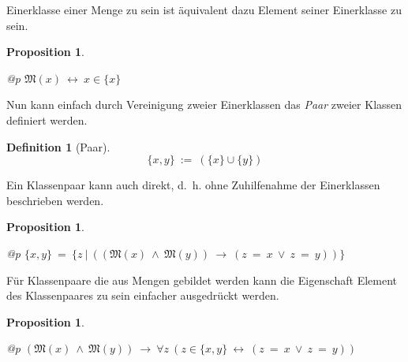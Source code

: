 \documentclass[a4paper,german,10pt,twoside]{book}
\newtheorem{prop}[thm]{Proposition}
\theoremstyle{definition}
\newtheorem{defn}[thm]{Definition}
\theoremstyle{remark}
\begin{document}
\par
Einerklasse einer Menge zu sein ist {\"a}quivalent dazu Element seiner
Einerklasse zu sein.

\begin{prop}
\label{theorem:setSingletonEqualHasItselfAsElement} \hypertarget{theorem:setSingletonEqualHasItselfAsElement}{}
\mbox{}
\begin{longtable}{{@{\extracolsep{\fill}}p{\linewidth}}}
\centering $\mathfrak{M}(x)\ \leftrightarrow \ x \in \{ x \}$
\end{longtable}

\end{prop}




\par
Nun kann einfach durch Vereinigung zweier Einerklassen das \emph{Paar}
zweier Klassen definiert werden.

\begin{defn}[Paar]
\label{definition:pair} \hypertarget{definition:pair}{}
$$\{ x, y \}\ := \ (\{ x \} \cup \{ y \})$$

\end{defn}




\par
Ein Klassenpaar kann auch direkt, d.~h. ohne Zuhilfenahme der Einerklassen
beschrieben werden.

\begin{prop}
\label{theorem:classPairIsEqual} \hypertarget{theorem:classPairIsEqual}{}
\mbox{}
\begin{longtable}{{@{\extracolsep{\fill}}p{\linewidth}}}
\centering $\{ x, y \} \ =  \ \{ z \ | \ ((\mathfrak{M}(x)\ \land \ \mathfrak{M}(y))\ \rightarrow \ (z \ =  \ x\ \lor \ z \ =  \ y)) \} $
\end{longtable}

\end{prop}




\par
F{\"u}r Klassenpaare die aus Mengen gebildet werden kann die Eigenschaft Element 
des Klassenpaares zu sein einfacher ausgedr{\"u}ckt werden.

\begin{prop}
\label{theorem:membershipOfClassPair} \hypertarget{theorem:membershipOfClassPair}{}
\mbox{}
\begin{longtable}{{@{\extracolsep{\fill}}p{\linewidth}}}
\centering $(\mathfrak{M}(x)\ \land \ \mathfrak{M}(y))\ \rightarrow \ \forall z\ (z \in \{ x, y \}\ \leftrightarrow \ (z \ =  \ x\ \lor \ z \ =  \ y))$
\end{longtable}

\end{prop}
\end{document}

